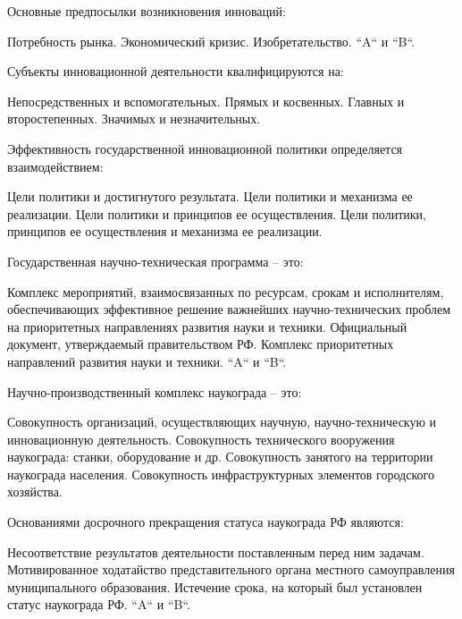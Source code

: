 \documentclass[12pt, table]{exam}
\begin{document}
\begin{questions}
\begin{multicols}{2}
\question Основные предпосылки возникновения инноваций:
\begin{choices}
	\choice Потребность рынка.
	\choice Экономический кризис.
	\choice Изобретательство.
	\CC ``A`` и ``B``.
\end{choices}

\question Субъекты инновационной деятельности квалифицируются на:
\begin{choices}
	\CC Непосредственных и вспомогательных.
	\choice Прямых и косвенных.
	\choice Главных и второстепенных.
	\choice Значимых и незначительных.
\end{choices}

\question Эффективность государственной инновационной политики определяется взаимодействием: 
\begin{choices}
	\choice Цели политики и достигнутого результата.
	\choice Цели политики и механизма ее реализации.
	\choice Цели политики и принципов ее осуществления.
	\CC Цели политики, принципов ее осуществления и механизма ее реализации. 
\end{choices}

\question Государственная научно-техническая программа – это:
\begin{choices}
	\choice Комплекс мероприятий, взаимосвязанных по ресурсам, срокам и исполнителям, обеспечивающих эффективное решение важнейших научно-технических проблем на приоритетных направлениях развития науки и техники.
	\choice Официальный документ, утверждаемый правительством РФ.
	\choice Комплекс приоритетных направлений развития науки и техники.
	\CC ``A`` и ``B``.
\end{choices}

\question Научно-производственный комплекс наукограда – это:
\begin{choices}
	\CC Совокупность организаций, осуществляющих научную, научно-техническую и инновационную деятельность.
	\choice Совокупность технического вооружения наукограда: станки, оборудование и др.
	\choice Совокупность занятого на территории наукограда населения.
	\choice Совокупность инфраструктурных элементов городского хозяйства.
\end{choices}

\question Основаниями досрочного прекращения статуса наукограда РФ являются:
\begin{choices}
	\choice Несоответствие результатов деятельности поставленным перед ним задачам.
	\choice Мотивированное ходатайство представительного органа местного самоуправления муниципального образования.
	\choice Истечение срока, на который был установлен статус наукограда РФ.
	\CC ``A`` и ``B``. 
\end{choices}


\end{multicols}
\end{questions}
\end{document}
